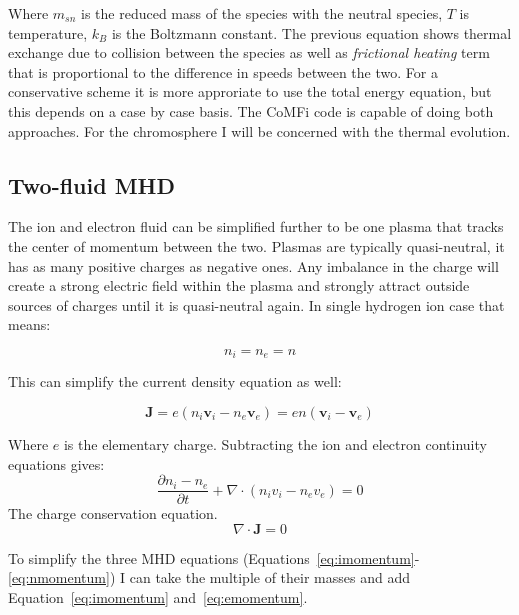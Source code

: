 \documentclass[12pt,upcase]{umlthesis}
\begin{document}
Where $m_{sn}$ is the reduced mass of the species with the neutral species, $T$ is temperature, $k_B$ is the Boltzmann constant. The previous equation shows thermal exchange due to collision between the species as well as {\it frictional heating\/} term that is proportional to the difference in speeds between the two. For a conservative scheme it is more approriate to use the total energy equation, but this depends on a case by case basis. The CoMFi code is capable of doing both approaches. For the chromosphere I will be concerned with the thermal evolution.

\subsection{Two-fluid MHD}\label{sec:2fluidmhd}

The ion and electron fluid can be simplified further to be one plasma that tracks the center of momentum between the two. Plasmas are typically quasi-neutral, it has as many positive charges as negative ones. Any imbalance in the charge will create a strong electric field within the plasma and strongly attract outside sources of charges until it is quasi-neutral again. In single hydrogen ion case that means:


\begin{equation}\label{eq:quasineutrality}
	n_i = n_e = n
\end{equation}

This can simplify the current density equation as well:

\begin{equation}\label{eq:currentdensity}
	\textbf{J} = e ( n_i \textbf{v}_i - n_e \textbf{v}_e) = e n (\textbf{v}_i - \textbf{v}_e)
\end{equation}

Where $e$ is the elementary charge. Subtracting the ion and electron continuity equations gives:
\begin{equation}
	\frac{\partial n_i - n_e}{\partial t} + \nabla\cdot(n_i v_i - n_e v_e) = 0
\end{equation}
The charge conservation equation.
\begin{equation}\label{eq:chargeconservation}
	\nabla\cdot\textbf{J} = 0
\end{equation}


To simplify the three MHD equations (Equations~\ref{eq:imomentum}-\ref{eq:nmomentum}) I can take the multiple of their masses and add Equation~\ref{eq:imomentum} and~\ref{eq:emomentum}.
\end{document}
